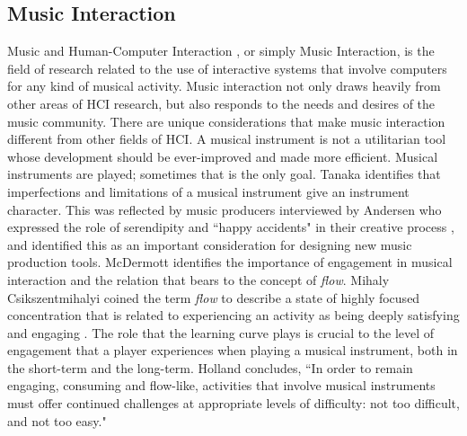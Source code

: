 \subsection{Music Interaction}
Music and Human-Computer Interaction \cite{holland2013music}, or simply Music Interaction, is the field of research related to the use of interactive systems that involve computers for any kind of musical activity. Music interaction not only draws heavily from other areas of HCI research, but also responds to the needs and desires of the music community. There are unique considerations that make music interaction different from other fields of HCI. A musical instrument is not a utilitarian tool whose development should be ever-improved and made more efficient. Musical instruments are played; sometimes that is the only goal. Tanaka \cite{tanaka2000musical} identifies that imperfections and limitations of a musical instrument give an instrument character. This was reflected by music producers interviewed by Andersen who expressed the role of serendipity and ``happy accidents" in their creative process \cite{andersen2016conversations}, and identified this as an important consideration for designing new music production tools. McDermott \cite{mcdermott2013should} identifies the importance of engagement in musical interaction and the relation that bears to the concept of \textit{flow}. Mihaly Csikszentmihalyi coined the term \textit{flow} to describe a state of highly focused concentration that is related to experiencing an activity as being deeply satisfying and engaging \cite{csikszentmihalyi1990flow}. The role that the learning curve plays is crucial to the level of engagement that a player experiences when playing a musical instrument, both in the short-term and the long-term. Holland \cite{holland2013music} concludes, ``In order to remain engaging, consuming and flow-like, activities that involve musical instruments must offer continued challenges at appropriate levels of difficulty: not too difficult, and not too easy." 

